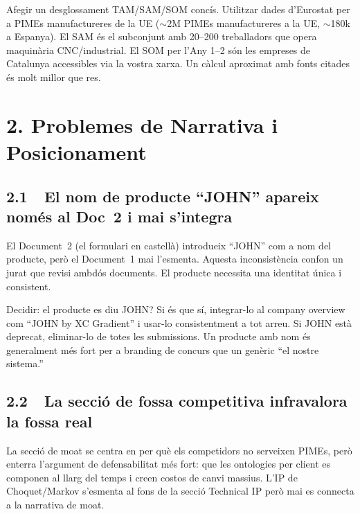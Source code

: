 \documentclass[11pt,a4paper]{article}
\begin{document}
\begin{fixbox}
Afegir un desglossament TAM/SAM/SOM concís. Utilitzar dades d'Eurostat per a PIMEs manufactureres de la UE ($\sim$2M PIMEs manufactureres a la UE, $\sim$180k a Espanya). El SAM és el subconjunt amb 20--200 treballadors que opera maquinària CNC/industrial. El SOM per l'Any 1--2 són les empreses de Catalunya accessibles via la vostra xarxa. Un càlcul aproximat amb fonts citades és molt millor que res.
\end{fixbox}

\section{2. Problemes de Narrativa i Posicionament}

\subsection{2.1~~El nom de producte ``JOHN'' apareix només al Doc~2 i mai s'integra}

\begin{issuebox}
El Document~2 (el formulari en castellà) introdueix ``JOHN'' com a nom del producte, però el Document~1 mai l'esmenta. Aquesta inconsistència confon un jurat que revisi ambdós documents. El producte necessita una identitat única i consistent.
\end{issuebox}

\begin{fixbox}
Decidir: el producte es diu JOHN? Si és que sí, integrar-lo al company overview com ``JOHN by XC Gradient'' i usar-lo consistentment a tot arreu. Si JOHN està deprecat, eliminar-lo de totes les submissions. Un producte amb nom és generalment més fort per a branding de concurs que un genèric ``el nostre sistema.''
\end{fixbox}

\subsection{2.2~~La secció de fossa competitiva infravalora la fossa real}

\begin{issuebox}
La secció de moat se centra en per què els competidors no serveixen PIMEs, però enterra l'argument de defensabilitat més fort: que les ontologies per client es componen al llarg del temps i creen costos de canvi massius. L'IP de Choquet/Markov s'esmenta al fons de la secció Technical IP però mai es connecta a la narrativa de moat.
\end{issuebox}
\end{document}
